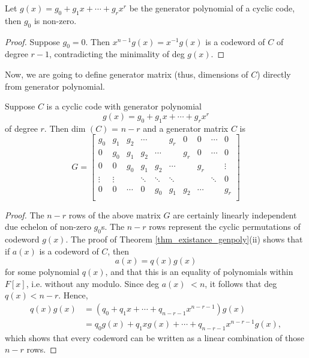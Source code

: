 \documentclass[../main.tex]{subfiles}
\newcommand{\poly}[1]{$#1(x)$}
\begin{document}
\begin{lem}
	Let $g(x) = g_0 + g_1x + \cdots + g_rx^r$ be the generator polynomial of a cyclic code, then $g_0$ is non-zero.
\end{lem}

\begin{proof}
	Suppose $g_0 = 0$. Then $x^{n-1}g(x) = x^{-1}g(x)$ is a codeword of $C$ of degree $r-1$, contradicting the minimality of deg \poly{g}.
\end{proof}

Now, we are going to define generator matrix (thus, dimensions of $C$) directly from generator polynomial.

\begin{thm}
	Suppose $C$ is a cyclic code with generator polynomial
	\[
		g(x) = g_0 + g_1x + \cdots + g_rx^r
	\]
	of degree $r$. Then dim $(C)$ = $n-r$ and a generator matrix $C$ is
	\[
		G=
		\begin{bmatrix}
			g_0 & g_1 & g_2 & \cdots & & g_r & 0 & 0 & \cdots & 0 \\
			0 & g_0 & g_1 & g_2 & \cdots &  & g_r & 0 & \cdots & 0 \\
			0 & 0 & g_0 & g_1 & g_2 & \cdots &  & g_r &  & \vdots \\
			\vdots & \vdots & & \ddots & \ddots & \ddots & & & \ddots & 0 \\
			0 & 0 & \cdots & 0 & g_0 & g_1 & g_2 & \cdots &  & g_r \\
		\end{bmatrix}
	\]
\end{thm}

\begin{proof}
	The $n-r$ rows of the above matrix $G$ are certainly linearly independent due echelon of non-zero $g_0$s. The $n-r$ rows represent the cyclic permutations of codeword $g(x)$. The proof of Theorem \ref{thm_existance_genpoly}(ii) shows that if $a(x)$ is a codeword of $C$, then
	\[
		a(x) = q(x)g(x)
	\]
	for some polynomial $q(x)$, and that this is an equality of polynomials within $F[x]$, i.e. without any modulo. Since deg \poly{a} $< n$, it follows that deg $q(x) < n-r $. Hence,
	\begin{align*}
		q(x)g(x) &= (q_0 + q_1x + \cdots + q_{n-r-1}x^{n-r-1})g(x) \\
		&= q_0g(x) + q_1xg(x) + \cdots + q_{n-r-1}x^{n-r-1}g(x),
	\end{align*}
	which shows that every codeword can be written as a linear combination of those $n-r$ rows.
\end{proof}
\end{document}
